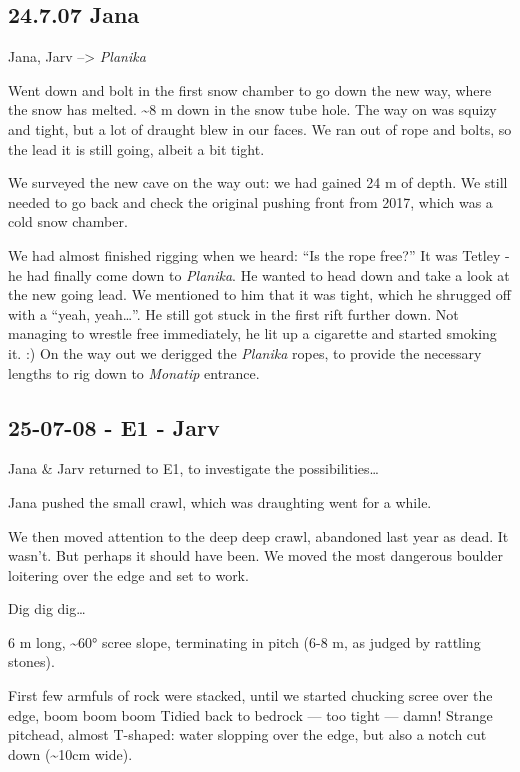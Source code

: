 \subsection{24.7.07 Jana}

Jana, Jarv --\textgreater{} \emph{Planika}

Went down and bolt in the first snow chamber to go down the new way,
where the snow has melted. \textasciitilde 8 m down in the snow tube
hole. The way on was squizy and tight, but a lot of draught blew in our
faces. We ran out of rope and bolts, so the lead it is still going,
albeit a bit tight.

We surveyed the new cave on the way out: we had gained 24 m of depth. We
still needed to go back and check the original pushing front from 2017,
which was a cold snow chamber.

We had almost finished rigging when we heard: ``Is the rope free?'' It
was Tetley - he had finally come down to \emph{Planika}. He wanted to
head down and take a look at the new going lead. We mentioned to him
that it was tight, which he shrugged off with a ``yeah, yeah\ldots{}''.
He still got stuck in the first rift further down. Not managing to
wrestle free immediately, he lit up a cigarette and started smoking it.
:) On the way out we derigged the \emph{Planika} ropes, to provide the
necessary lengths to rig down to \emph{Monatip} entrance.



\subsection{25-07-08 - E1 - Jarv}

Jana \& Jarv returned to E1, to investigate the possibilities\ldots{}

Jana pushed the small crawl, which was draughting went for a while.

We then moved attention to the deep deep crawl, abandoned last year as
dead. It wasn't. But perhaps it should have been. We moved the most
dangerous boulder loitering over the edge and set to work.

Dig dig dig\ldots{}

6 m long, \textasciitilde 60° scree slope, terminating in pitch (6-8 m,
as judged by rattling stones).

First few armfuls of rock were stacked, until we started chucking scree
over the edge, boom boom boom Tidied back to bedrock --- too tight ---
damn! Strange pitchead, almost T-shaped: water slopping over the edge,
but also a notch cut down (\textasciitilde10cm wide).

